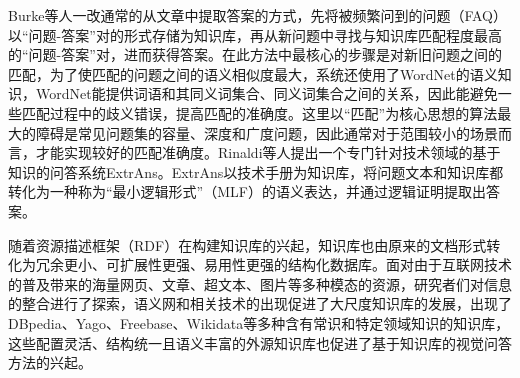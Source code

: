 Burke等人一改通常的从文章中提取答案的方式，先将被频繁问到的问题（FAQ）以“问题-答案”对的形式存储为知识库，再从新问题中寻找与知识库匹配程度最高的“问题-答案”对，进而获得答案。在此方法中最核心的步骤是对新旧问题之间的匹配，为了使匹配的问题之间的语义相似度最大，系统还使用了WordNet的语义知识，WordNet能提供词语和其同义词集合、同义词集合之间的关系，因此能避免一些匹配过程中的歧义错误，提高匹配的准确度。这里以“匹配”为核心思想的算法最大的障碍是常见问题集的容量、深度和广度问题，因此通常对于范围较小的场景而言，才能实现较好的匹配准确度。Rinaldi等人提出一个专门针对技术领域的基于知识的问答系统ExtrAns。ExtrAns以技术手册为知识库，将问题文本和知识库都转化为一种称为“最小逻辑形式”（MLF）的语义表达，并通过逻辑证明提取出答案。

随着资源描述框架（RDF）在构建知识库的兴起，知识库也由原来的文档形式转化为冗余更小、可扩展性更强、易用性更强的结构化数据库。面对由于互联网技术的普及带来的海量网页、文章、超文本、图片等多种模态的资源，研究者们对信息的整合进行了探索，语义网和相关技术的出现促进了大尺度知识库的发展，出现了DBpedia、Yago、Freebase、Wikidata等多种含有常识和特定领域知识的知识库，这些配置灵活、结构统一且语义丰富的外源知识库也促进了基于知识库的视觉问答方法的兴起。

